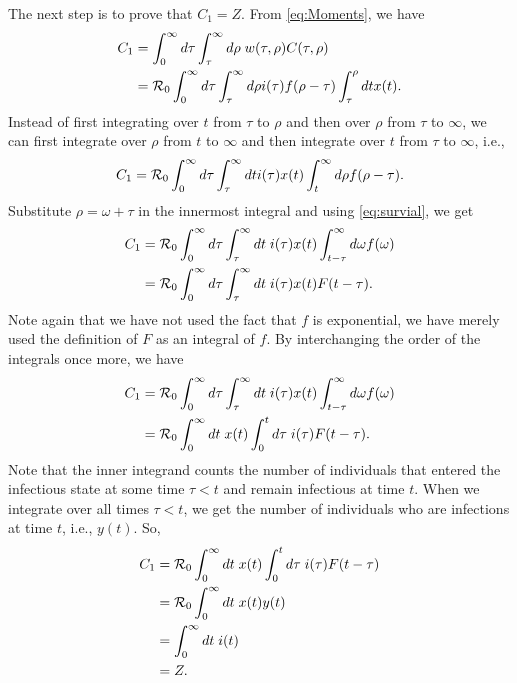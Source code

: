 
The next step is to prove that $C_1 = Z$.
From \autoref{eq:Moments}, we have
\begin{align*}
        C_1 &= \int_0^\infty d\tau \int_\tau^\infty d\rho \; w(\tau,\rho) C(\tau,\rho)\\
        &= {\mathcal R}_{\mathrm{0}}\int_0^\infty d\tau \int_\tau^\infty d\rho i(\tau) f(\rho-\tau) \int_\tau^{\rho} dt x(t).
\end{align*}
Instead of first integrating over $t$ from $\tau$ to $\rho$ and then over $\rho$ from $\tau$ to $\infty$, we can first integrate over $\rho$ from $t$ to $\infty$ and then integrate over $t$ from $\tau$ to $\infty$, i.e.,
\begin{equation*}
    C_1 ={\mathcal R}_{\mathrm{0}}\int_0^\infty d\tau \int_\tau^\infty dt i(\tau) x(t) \int_t^\infty d\rho f(\rho-\tau). 
\end{equation*}
Substitute $\rho = \omega + \tau$ in the innermost integral and using \autoref{eq:survial}, we get
\begin{align*}
    \begin{split}
        C_1 &= {\mathcal R}_{\mathrm{0}}\int_0^\infty d\tau \int_\tau^\infty dt\; i(\tau)x(t) \int_{t-\tau}^\infty d\omega f(\omega)\\
        &=  {\mathcal R}_{\mathrm{0}}\int_0^\infty d\tau \int_\tau^\infty dt\; i(\tau)x(t) F(t-\tau).
    \end{split}
\end{align*}
Note again that we have not used the fact that $f$ is exponential, we have merely used the definition of $F$ as an integral of $f$.
By interchanging the order of the integrals once more, we have
\begin{align*}
        C_1 &= {\mathcal R}_{\mathrm{0}}\int_0^\infty d\tau \int_\tau^\infty dt\; i(\tau)x(t) \int_{t-\tau}^\infty d\omega f(\omega)\\
        &=  {\mathcal R}_{\mathrm{0}}\int_0^\infty dt\; x(t) \int_0^t d\tau\; i(\tau)F(t-\tau). 
\end{align*}
Note that the inner integrand counts the number of individuals that entered the infectious state at some time $\tau < t$ and remain infectious  at time $t$. When we integrate over all times $\tau < t$, we get the number of individuals who are infections at time $t$, i.e., $y(t)$.
 So,
\begin{align}
        C_1 &= {\mathcal R}_{\mathrm{0}}\int_0^\infty dt\; x(t) \int_0^t d\tau\; i(\tau)F(t-\tau) \label{eq:C1calc_prev}\\
        &= {\mathcal R}_{\mathrm{0}}\int_0^\infty dt\; x(t)y(t)     \label{eq:C1calc}\\
        &= \int_0^\infty dt\; i(t)\\
        &=Z.
\end{align}

